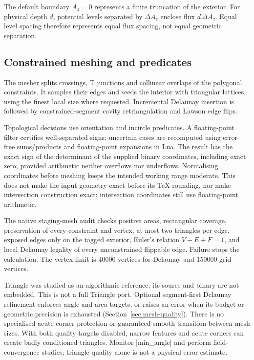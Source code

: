 The default boundary $A_z=0$ represents a finite truncation of the
exterior. For physical depth $d$, potential levels separated by $\Delta A_z$
enclose flux $d\,\Delta A_z$. Equal level spacing therefore represents equal
flux spacing, not equal geometric separation.

\subsection{Constrained meshing and predicates}
The mesher splits crossings, T junctions and collinear overlaps of the
polygonal constraints. It samples their edges and seeds the interior
with triangular lattices, using the finest local size where requested.
Incremental Delaunay insertion is followed by constrained-segment cavity
retriangulation and Lawson edge flips.

Topological decisions use orientation and incircle predicates. A
floating-point filter certifies well-separated signs; uncertain cases
are recomputed using error-free sums/products and floating-point
expansions in Lua. The result has the exact sign of the determinant of
the supplied binary coordinates, including exact zero, provided arithmetic
neither overflows nor underflows. Normalising coordinates before meshing
keeps the intended working range moderate. This does not make the input
geometry exact before its TeX rounding, nor make intersection construction
exact: intersection coordinates still use floating-point arithmetic.

The native staging-mesh audit checks positive areas, rectangular coverage, preservation
of every constraint and vertex, at most two triangles per edge, exposed
edges only on the tagged exterior, Euler's relation $V-E+F=1$, and local
Delaunay legality of every unconstrained flippable edge. Failure stops
the calculation. The vertex limit is 40000 vertices for Delaunay and
150000 grid vertices.

Triangle was studied as an algorithmic reference; its source and binary
are not embedded. This is not a full Triangle port. Optional segment-first
Delaunay refinement enforces angle and area targets, or raises an error
when its budget or geometric precision is exhausted (Section~\ref{sec:mesh-quality}).
There is no specialised acute-corner protection or guaranteed smooth
transition between mesh sizes. With both quality targets disabled, narrow
features and acute corners can create badly conditioned triangles.
Monitor |min_angle| and perform field-convergence studies; triangle quality
alone is not a physical error estimate.

